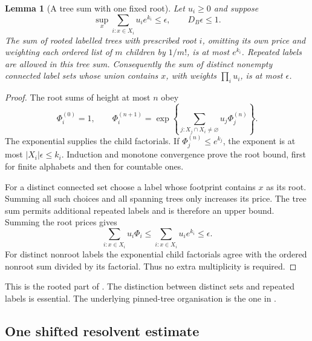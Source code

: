 \documentclass[11pt,reqno]{amsart}
\numberwithin{equation}{section}
\newtheorem{lemma}[theorem]{Lemma}
\theoremstyle{definition}
\theoremstyle{remark}
\begin{document}
\begin{lemma}[A tree sum with one fixed root]
\label{lem:connected-positive-tree}
Let \(u_i\ge0\) and suppose
\[
       \sup_x\sum_{i:x\in X_i}u_i e^{k_i}
                                  \le\epsilon,\qquad
                                  D_B\epsilon\le1.
\]
The sum of rooted labelled trees with prescribed
root \(i\), omitting its own price and weighting
each ordered list of \(m\) children by \(1/m!\),
is at most \(e^{k_i}\).
Repeated labels are allowed in this tree sum.
Consequently the sum of distinct nonempty
connected label sets whose union contains \(x\),
with weights \(\prod_i u_i\), is at most
\(\epsilon\).
\end{lemma}
\begin{proof}
The root sums of height at most \(n\) obey
\[
 \Phi_i^{(0)}=1,\qquad
 \Phi_i^{(n+1)}
       =\exp\left\{\sum_{j:X_j\cap X_i\ne\varnothing}
                                  u_j\Phi_j^{(n)}\right\}.
\]
The exponential supplies the child factorials.
If \(\Phi_j^{(n)}\le e^{k_j}\), the exponent is
at most \(|X_i|\epsilon\le k_i\).
Induction and monotone convergence prove the
root bound, first for finite alphabets and then
for countable ones.

For a distinct connected set choose a label
whose footprint contains \(x\) as its root.
Summing all such choices and all spanning
trees only increases its price.
The tree sum permits additional repeated
labels and is therefore an upper bound.
Summing the root prices gives
\[
          \sum_{i:x\in X_i}u_i\Phi_i
                   \le\sum_{i:x\in X_i}u_i e^{k_i}
                   \le\epsilon .
\]
For distinct nonroot labels the exponential
child factorials agree with the ordered
nonroot sum divided by its factorial.
Thus no extra multiplicity is required.
\end{proof}

This is the rooted part of
\cite[Lemma~9.1, pp.~31--32]{Main}.
The distinction between distinct sets and
repeated labels is essential.
The underlying pinned-tree organisation is
the one in \cite[Section~2, (2.6)--(2.7),
preprint pp.~3--4]{FP07}.

\subsection{One shifted resolvent estimate}
\end{document}
